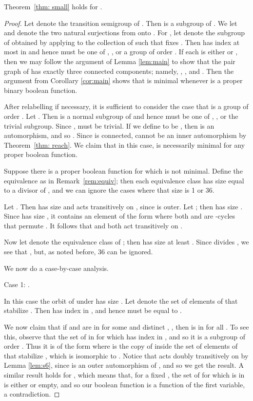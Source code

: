 \documentclass{llncs}
\begin{document}
\begin{proposition}
Theorem~\ref{thm: small} holds for .
\end{proposition}
\begin{proof}  Let  denote the transition semigroup of .  Then  is a subgroup of .  We let  and  denote the two natural surjections from  onto .  For , let  denote the subgroup of  obtained by applying  to the collection of  such that  fixes .  Then  has index at most  in  and hence must be one of , , or a group of order .  If each  is either  or , then we may follow the argument of Lemma \ref{lem:main} to show that the pair graph of  has exactly three connected components; namely,
, , and 
.  Then the argument from Corollary \ref{cor:main} shows that  is minimal whenever  is a proper binary boolean function.

After relabelling if necessary, it is sufficient to consider the case that  is a group of order .   Let .  Then  is a normal subgroup of  and hence must be one of  , , or the trivial subgroup.  
Since ,  must be trivial.  
If we define  to be ,
then  is an automorphism, and so .   Since  is connected,   cannot be an inner automorphism by Theorem~\ref{thm: reach}.  We claim that in this case,  is necessarily minimal for any proper boolean function.


Suppose  there is a proper boolean function  for which  is not minimal.  
Define the equivalence  as in Remark~\ref{rem:equiv};
then each equivalence class has size equal to a divisor of , and we can ignore the cases where that size is 1 or 36.    

Let .  Then  has size  and  acts transitively on , since  is outer.  Let ; then  has size . 
Since  has size , it contains an element of the form  where both  and  are -cycles that permute .  It follows that  and  both act transitively on . 

Now let  denote the equivalence class of ; then  has size at least .  Since  divides , we see that , but, as noted before, 36 can be ignored.  

We now do a case-by-case analysis.  

\item[Case 1: .]

In this case  the orbit of  under  has size .  Let  denote the set of elements of  that stabilize .  Then  has index  in , and hence must be equal to .

We now claim that if   and  are in  for some  and distinct , , then  is in  for all .  To see this, observe that the set of  in  for which  has index  in , and so it is a subgroup of order .  
Thus it is of the form  where  is the copy of  inside the set of elements of  that stabilize , which is isomorphic to .   
Notice that  acts doubly transitively on  by Lemma \ref{lem:s6}, since  is an outer automorphism of , and so we get the result.  A similar result holds for , which means that, for a fixed , the set of  for which  is in  is either  or empty, and so our boolean function is a function of the first variable, a contradiction.


\end{proof}
\end{document}
